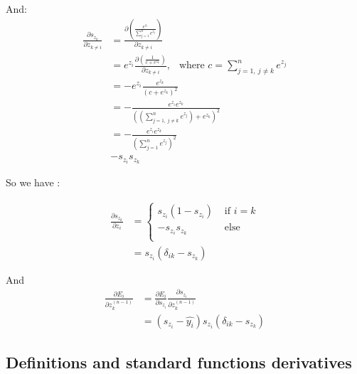 \documentclass[11pt,a4paper]{report}
\begin{document}
And:
\begin{equation}
\begin{split}
    \frac{\partial s_{z_{k}}}{\partial z_{k\neq i}}  &= \frac{\partial \left(\frac{e^{z_i}}{\sum\limits_{j=1}^{n} e^{z_j}}\right)}{\partial z_{k\neq i}}\\
    &= e^{z_i}\frac{\partial \left(\frac{1}{c + e^{z_{k}}}\right)}{\partial z_{k\neq i}},\ \ \text{ where } c = \sum\limits_{j=1,\ j\neq k}^n e^{z_j}\\
    &= -e^{z_i}\frac{e^{z_k}}{(c+e^{z_{k}})^2}\\
    &= -\frac{e^{z_i}e^{z_k}}{\left(\left(\sum\limits_{j=1,\ j\neq k}^n e^{z_j}\right)+e^{z_{k}}\right)^2}\\
    &= -\frac{e^{z_i}e^{z_k}}{\left(\sum\limits_{j=1}^n e^{z_j}\right)^2}\\
    & - s_{z_i}s_{z_k}
\end{split}
\end{equation}

So we have :

\begin{equation}
\begin{split}
\frac{\partial s_{z_k}}{\partial z_{i}} &= 
    \begin{cases}
       s_{z_i} (1 - s_{z_i}) &\text{ if } i=k\\
       -s_{z_i} s_{z_k} &\text{ else } \\
    \end{cases}\\
    &= s_{z_i}\left( \delta_{ik} - s_{z_k}\right)
\end{split}
\end{equation}

And
\begin{equation}
\begin{split}
    \frac{\partial E_i}{\partial z_k^{(n-1)}} &= \frac{\partial E_i}{\partial s_{z_i}} \frac{\partial s_{z_i}}{\partial z_k^{(n-1)}}\\
    &= \left( s_{z_i} - \hat{y_i}\right) s_{z_i}\left( \delta_{ik} - s_{z_k} \right)
\end{split}
\end{equation}

\subsection{Definitions and standard functions derivatives}
\end{document}
